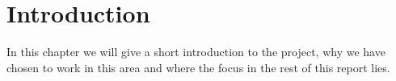 \chapter{Introduction}
In this chapter we will give a short introduction to the project, why we have chosen to work in this area and where the focus in the rest of this report lies. 


%

